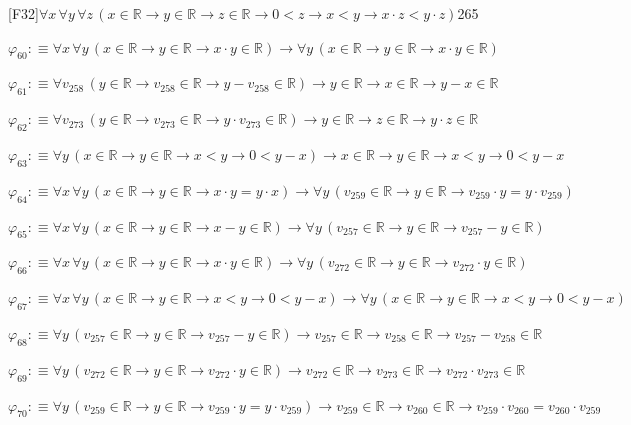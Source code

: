 \begin{fullproof}{[F32]}{$\forall x\,\forall y\,\forall z\,(x \in \mathbb{R} \to y \in \mathbb{R} \to z \in \mathbb{R} \to 0 < z \to x < y \to x \cdot z < y \cdot z)$}{265}
\begin{abbrevlist}
\item $\varphi_{60} :\equiv \forall x\,\forall y\,(x \in \mathbb{R} \to y \in \mathbb{R} \to x \cdot y \in \mathbb{R}) \to \forall y\,(x \in \mathbb{R} \to y \in \mathbb{R} \to x \cdot y \in \mathbb{R})$
\item $\varphi_{61} :\equiv \forall v_{258}\,(y \in \mathbb{R} \to v_{258} \in \mathbb{R} \to y - v_{258} \in \mathbb{R}) \to y \in \mathbb{R} \to x \in \mathbb{R} \to y - x \in \mathbb{R}$
\item $\varphi_{62} :\equiv \forall v_{273}\,(y \in \mathbb{R} \to v_{273} \in \mathbb{R} \to y \cdot v_{273} \in \mathbb{R}) \to y \in \mathbb{R} \to z \in \mathbb{R} \to y \cdot z \in \mathbb{R}$
\item $\varphi_{63} :\equiv \forall y\,(x \in \mathbb{R} \to y \in \mathbb{R} \to x < y \to 0 < y - x) \to x \in \mathbb{R} \to y \in \mathbb{R} \to x < y \to 0 < y - x$
\item $\varphi_{64} :\equiv \forall x\,\forall y\,(x \in \mathbb{R} \to y \in \mathbb{R} \to x \cdot y = y \cdot x) \to \forall y\,(v_{259} \in \mathbb{R} \to y \in \mathbb{R} \to v_{259} \cdot y = y \cdot v_{259})$
\item $\varphi_{65} :\equiv \forall x\,\forall y\,(x \in \mathbb{R} \to y \in \mathbb{R} \to x - y \in \mathbb{R}) \to \forall y\,(v_{257} \in \mathbb{R} \to y \in \mathbb{R} \to v_{257} - y \in \mathbb{R})$
\item $\varphi_{66} :\equiv \forall x\,\forall y\,(x \in \mathbb{R} \to y \in \mathbb{R} \to x \cdot y \in \mathbb{R}) \to \forall y\,(v_{272} \in \mathbb{R} \to y \in \mathbb{R} \to v_{272} \cdot y \in \mathbb{R})$
\item $\varphi_{67} :\equiv \forall x\,\forall y\,(x \in \mathbb{R} \to y \in \mathbb{R} \to x < y \to 0 < y - x) \to \forall y\,(x \in \mathbb{R} \to y \in \mathbb{R} \to x < y \to 0 < y - x)$
\item $\varphi_{68} :\equiv \forall y\,(v_{257} \in \mathbb{R} \to y \in \mathbb{R} \to v_{257} - y \in \mathbb{R}) \to v_{257} \in \mathbb{R} \to v_{258} \in \mathbb{R} \to v_{257} - v_{258} \in \mathbb{R}$
\item $\varphi_{69} :\equiv \forall y\,(v_{272} \in \mathbb{R} \to y \in \mathbb{R} \to v_{272} \cdot y \in \mathbb{R}) \to v_{272} \in \mathbb{R} \to v_{273} \in \mathbb{R} \to v_{272} \cdot v_{273} \in \mathbb{R}$
\item $\varphi_{70} :\equiv \forall y\,(v_{259} \in \mathbb{R} \to y \in \mathbb{R} \to v_{259} \cdot y = y \cdot v_{259}) \to v_{259} \in \mathbb{R} \to v_{260} \in \mathbb{R} \to v_{259} \cdot v_{260} = v_{260} \cdot v_{259}$

\end{abbrevlist}
\end{fullproof}
